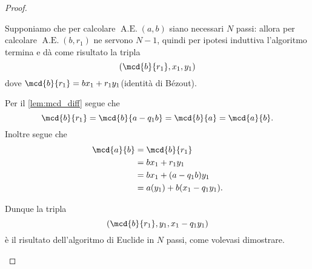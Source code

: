 \begin{proof}
\begin{description}
\begin{description}
            Supponiamo che per calcolare $\operatorname{A.E.}(a, b)$ siano necessari $N$ passi: allora per calcolare $\operatorname{A.E.}(b, r_1)$ ne servono $N-1$, quindi per ipotesi induttiva l'algoritmo termina e dà come risultato la tripla \[
                (\mcd{b}{r_1}, x_1, y_1) 
            \] dove $\mcd{b}{r_1} = bx_1 + r_1y_1$(identità di Bézout).

            Per il \autoref{lem:mcd_diff} segue che \[
                \mcd{b}{r_1} = \mcd{b}{a - q_1b} = \mcd{b}{a} = \mcd{a}{b}.
            \] Inoltre segue che \begin{align*}
                \mcd{a}{b} &= \mcd{b}{r_1} \\
                &= bx_1 + r_1y_1 \\
                &= bx_1 + (a - q_1b)y_1 \\
                &= a(y_1) + b(x_1 - q_1y_1).
            \end{align*}

            Dunque la tripla \[
                (\mcd{b}{r_1}, y_1, x_1 - q_1y_1)    
            \] è il risultato dell'algoritmo di Euclide in $N$ passi, come volevasi dimostrare. \qedhere
        \end{description} 
    \end{description}
\end{proof}